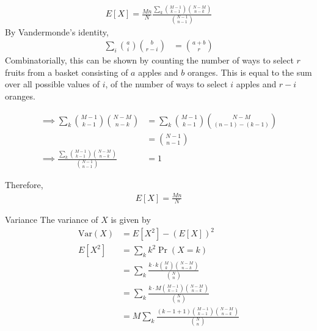 \documentclass{beamer}
\providecommand{\pr}[1]{\ensuremath{\Pr\left(#1\right)}}
\providecommand{\brak}[1]{\ensuremath{\left(#1\right)}}
\begin{document}
	\begin{frame}
	\begin{align}
		E[X] = \frac{Mn}{N} \frac{\sum_k \binom{M-1}{k-1} \binom{N-M}{n-k}}{\binom{N-1}{n-1}}
	\end{align}
	By Vandermonde's identity,
	\begin{align}
		\sum_i \binom{a}{i}\binom{b}{r-i} &= \binom{a+b}{r}
	\end{align}
	Combinatorially, this can be shown by counting the number of ways to select $r$ fruits from a basket consisting of $a$ apples and $b$ oranges. This is equal to the sum over all possible values of $i$, of the number of ways to select $i$ apples and $r-i$ oranges.
	\end{frame}
	
	\begin{frame}
	\begin{align}
		\implies \sum_k \binom{M-1}{k-1} \binom{N-M}{n-k} &= \sum_k \binom{M-1}{k-1} \binom{N-M}{(n-1)-(k-1)} \\
		&= \binom{N-1}{n-1} \\
		\implies \frac{\sum_k \binom{M-1}{k-1} \binom{N-M}{n-k}}{\binom{N-1}{n-1}} &= 1
	\end{align}
	\begin{block}{}
	Therefore,
		\begin{align}
			E[X] = \frac{Mn}{N}
		\end{align}
	\end{block}
	\end{frame}
	
	\begin{frame}{Variance}
	The variance of $X$ is given by
	\begin{align}
		\mathrm{Var}(X) &= E[X^2] - \brak{E[X]}^2 \\
		E[X^2] &= \sum_k k^2 \pr{X=k} \\
		&= \sum_k \frac{k \cdot k \binom{M}{k} \binom{N-M}{n-k}}{\binom{N}{n}} \\
		&= \sum_k \frac{k \cdot M \binom{M-1}{k-1} \binom{N-M}{n-k}}{\binom{N}{n}} \\
		&= M \sum_k \frac{(k-1+1) \binom{M-1}{k-1} \binom{N-M}{n-k}}{\binom{N}{n}} \\
	\end{align}
	\end{frame}
	
\end{document}
